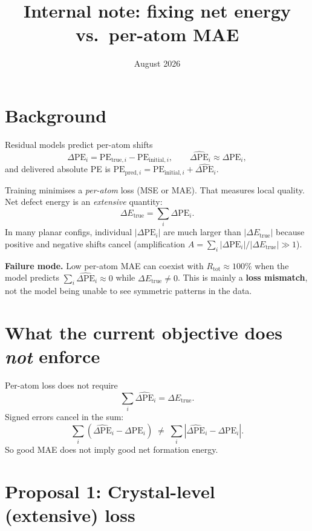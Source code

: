 \documentclass[11pt,a4paper]{article}
\title{\textbf{Internal note:} fixing net energy vs.\ per-atom MAE}
\date{August 2026}
\newcommand{\dPE}{\Delta\mathrm{PE}}
\newcommand{\dPEhat}{\widehat{\Delta\mathrm{PE}}}
\newcommand{\dEtrue}{\Delta E_{\mathrm{true}}}
\begin{document}
\maketitle

\section*{Background}

Residual models predict per-atom shifts
\begin{equation}
  \dPE_i = \mathrm{PE}_{\mathrm{true},i}-\mathrm{PE}_{\mathrm{initial},i},
  \qquad
  \dPEhat_i \approx \dPE_i,
\end{equation}
and delivered absolute PE is $\mathrm{PE}_{\mathrm{pred},i}=\mathrm{PE}_{\mathrm{initial},i}+\dPEhat_i$.

Training minimises a \emph{per-atom} loss (MSE or MAE). That measures local quality. Net defect energy is an \emph{extensive} quantity:
\begin{equation}
  \dEtrue = \sum_i \dPE_i.
\end{equation}
In many planar configs, individual $|\dPE_i|$ are much larger than $|\dEtrue|$ because positive and negative shifts cancel (amplification $A=\sum_i|\dPE_i|/|\dEtrue|\gg 1$).

\medskip
\noindent\textbf{Failure mode.} Low per-atom MAE can coexist with $R_{\mathrm{tot}}\approx 100\%$ when the model predicts $\sum_i \dPEhat_i \approx 0$ while $\dEtrue\neq 0$. This is mainly a \textbf{loss mismatch}, not the model being unable to see symmetric patterns in the data.

\section*{What the current objective does \emph{not} enforce}

Per-atom loss does not require
\begin{equation}
  \sum_i \dPEhat_i = \dEtrue.
\end{equation}
Signed errors cancel in the sum:
\begin{equation}
  \sum_i(\dPEhat_i-\dPE_i)
  \;\neq\;
  \sum_i|\dPEhat_i-\dPE_i|.
\end{equation}
So good MAE does not imply good net formation energy.

\section*{Proposal 1: Crystal-level (extensive) loss}
\end{document}
